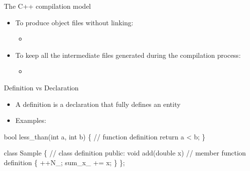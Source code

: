 \begin{frame}[fragile]{The C++ compilation model \insertcontinuationtext}
\begin{center}
    \end{center}

    \begin{itemize}
    \item<2-> To produce object files without linking:
      \begin{itemize}
      \item {}
      \end{itemize}
    \item<2-> To keep all the intermediate files generated during the compilation process:
      \begin{itemize}
      \item {}
      \end{itemize}
    \end{itemize}

\end{frame}

\begin{frame}[fragile]{Definition vs Declaration}

  \begin{itemize}
  \item A \alert{definition} is a declaration that fully defines an entity
  \item Examples:
  \end{itemize}

  \begin{codeblock}{
bool less_than(int a, int b) \{ // function definition
  return a < b;
\}

class Sample \{ // class definition
 public:
  void add(double x) // member function definition
  \{
    ++N_;
    sum_x_ += x;
    \ddd
  \}
  \ddd
\};
}\end{codeblock}

\end{frame}

